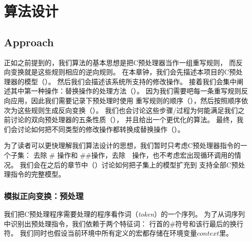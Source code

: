 \chapter{算法设计}
\section{Approach}
\label{sec:approach}
正如之前提到的，我们算法的基本思想是把C预处理器当作一组重写规则，
而反向变换就是这些规则相应的逆向规则。
在本章钟，我们会先描述本项目的C预处理器的模型（）。
然后我们会描述该系统所支持的修改操作。
接着我们会集中阐述其中第一种操作：替换操作的处理方法（）。
因为我们需要吧每一条重写规则反向应用，因此我们需要记录下预处理时使用
重写规则的顺序（），然后按照顺序依次为这些规则生成反向变换（）。
我们也会讨论这些步骤/过程为何能满足我们之前讨论的双向预处理器的五条性质（），
并且给出一个更优化的算法。
最终，我们会讨论如何把不同类型的修改操作都转换成替换操作（）。



为了读者可以更快理解我们算法设计的思想，我们暂时只考虑C预处理器指令的一个子集：
去除 \# 操作和 \#\#操作，去除~~操作，也不考虑宏出现循环调用的情况。
我们会在之后的章节中（）讨论如何把子集上的模型扩充到
支持全部C预处理指令的完整模型。

\newcommand{\dstart}{\ensuremath{\langle\#}\xspace}
\newcommand{\dend}{\ensuremath{\rangle}\xspace}

\subsection{模拟正向变换：预处理}\label{sec:forward}
我们把C预处理程序需要处理的程序看作词（\emph{token}）的一个序列。
为了从词序列中识别出预处理指令，我们依赖于两个特征词：
行首的\#符号和该行最后的换行符。
我们同时也假设当前环境中所有定义的宏都存储在环境变量\emph{$context$}里。

